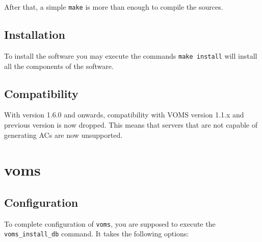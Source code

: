 \documentclass[a4paper]{book}
\begin{document}
After that, a simple \verb|make| is more than enough to compile the
sources.

\section{Installation}
To install the software you may execute the commands
\verb|make install| will install all the components of the software.

\section{Compatibility}
With version 1.6.0 and onwards, compatibility with VOMS version 1.1.x
and previous version is now dropped.  This means that servers that are
not capable of generating ACs are now unsupported.

\chapter{voms}
\section{Configuration}
To complete configuration of \verb|voms|, you are supposed to
execute the \newline\verb|voms_install_db| command.  It takes
the following options:
\end{document}
